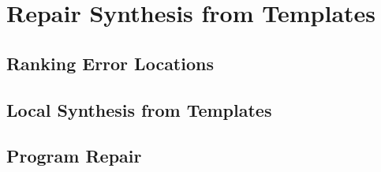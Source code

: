 \section{Repair Synthesis from Templates}
\label{sec:synthesis}

\subsection{Ranking Error Locations}
\label{subsec:location-rank}




\subsection{Local Synthesis from Templates}
\label{subsec:local-synthesis}





\subsection{Program Repair}
\label{subsec:repair}

